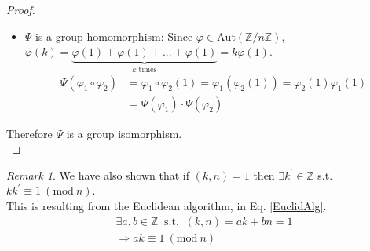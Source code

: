 \documentclass{article}
\theoremstyle{definition}
\theoremstyle{remark}
\newtheorem*{remark}{Remark}
\begin{document}
\begin{proof}
\begin{itemize}
		\item $\Psi$ is a group homomorphism:
			  Since $\varphi\in\mathrm{Aut}(\mathbb{Z}/n\mathbb{Z})$, $\varphi(k)=\underbrace{\varphi(1)+\varphi(1)+...+\varphi(1)}_{k\text{ times}}=k\varphi(1)$.\\
		      \begin{align*}
			      \Psi(\varphi_1\circ\varphi_2) & =\varphi_1\circ\varphi_2(1) =\varphi_1(\varphi_2(1))=\varphi_2(1)\varphi_1(1) \\
			                                    & =\Psi(\varphi_1)\cdot\Psi(\varphi_2)
			  \end{align*}
	\end{itemize}
	Therefore $\Psi$ is a group isomorphism.\\
\end{proof}
\begin{remark}
	We have also shown that if $(k,n)=1$ then $\exists k^{\prime}\in\mathbb{Z}$ s.t. $kk^{\prime}\equiv 1~(\mathrm{mod}~n)$.\\
	This is resulting from the Euclidean algorithm, in Eq. \ref{EuclidAlg}.\\
	\begin{align*}
		\exists a,b\in\mathbb{Z}~\text{ s.t. }~(k,n)=ak+bn=1\\
		\Rightarrow ak\equiv 1~(\mathrm{mod}~n)
	\end{align*} 
\end{remark}
\newpage
\end{document}
